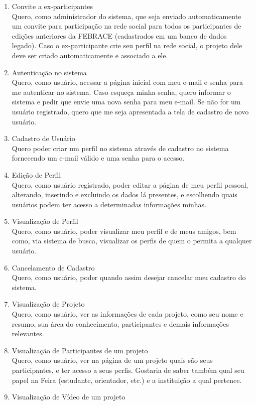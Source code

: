\documentclass[a4paper,12pt,font=plain,header=plain]{abnt}
\begin{document}
	\begin{enumerate}
	 \item Convite a ex-participantes \\
		Quero, como administrador do sistema, que seja enviado automaticamente um convite para participação na rede social para todos os participantes de edições anteriores da FEBRACE (cadastrados em um banco de dados legado). Caso o ex-participante crie seu perfil na rede social, o projeto dele deve ser criado automaticamente e associado a ele.
	 \item Autenticação no sistema \\
		Quero, como usuário, acessar a página inicial com meu e-mail e senha para me autenticar no sistema. Caso esqueça minha senha, quero informar o sistema e pedir que envie uma nova senha para meu e-mail. Se não for um usuário registrado, quero que me seja apresentada a tela de cadastro de novo usuário.
	 \item Cadastro de Usuário \\
		Quero poder criar um perfil no sistema através de cadastro no sistema fornecendo um e-mail válido e uma senha para o acesso.
	 \item Edição de Perfil \\
		Quero, como usuário registrado, poder editar a página de meu perfil pessoal, alterando, inserindo e excluindo os dados lá presentes, e escolhendo quais usuários podem ter acesso a determinadas informações minhas.
	 \item Visualização de Perfil \\
		Quero, como usuário, poder visualizar meu perfil e de meus amigos, bem como, via sistema de busca, visualizar os perfis de quem o permita a qualquer usuário.
	 \item Cancelamento de Cadastro \\
		Quero, como usuário, poder quando assim desejar cancelar meu cadastro do sistema.
	 \item Visualização de Projeto \\
		Quero, como usuário, ver as informações de cada projeto, como seu nome e resumo, sua área do conhecimento, participantes e demais informações relevantes.
	 \item Visualização de Participantes de um projeto \\
		Quero, como usuário, ver na página de um projeto quais são seus participantes, e ter acesso a seus perfis. Gostaria de saber também qual seu papel na Feira (estudante, orientador, etc.) e a instituição a qual pertence.
	 \item Visualização de Vídeo de um projeto \\

\end{enumerate}
\end{document}
